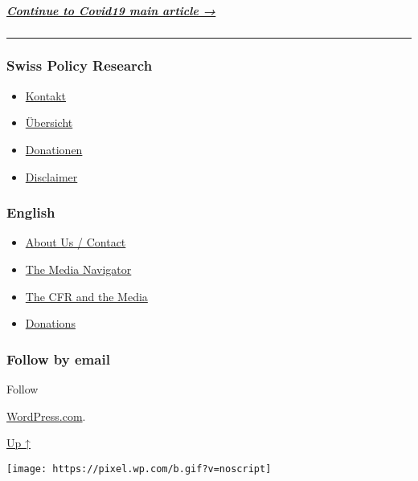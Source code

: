 \hypertarget{continue-to-covid19-main-article-}{%
\subparagraph{\texorpdfstring{\href{https://swprs.org/facts-about-covid19-greek/}{Continue
to Covid19 main article
→}}{Continue to Covid19 main article →}}\label{continue-to-covid19-main-article-}}

\begin{center}\rule{0.5\linewidth}{\linethickness}\end{center}

\hypertarget{swiss-policy-research}{%
\subsubsection{Swiss Policy Research}\label{swiss-policy-research}}

\begin{itemize}
\tightlist
\item
  \href{https://swprs.org/kontakt/}{Kontakt}
\item
  \href{https://swprs.org/uebersicht/}{Übersicht}
\item
  \href{https://swprs.org/donationen/}{Donationen}
\item
  \href{https://swprs.org/disclaimer/}{Disclaimer}
\end{itemize}

\hypertarget{english}{%
\subsubsection{English}\label{english}}

\begin{itemize}
\tightlist
\item
  \href{https://swprs.org/contact/}{About Us / Contact}
\item
  \href{https://swprs.org/media-navigator/}{The Media Navigator}
\item
  \href{https://swprs.org/the-american-empire-and-its-media/}{The CFR
  and the Media}
\item
  \href{https://swprs.org/donations/}{Donations}
\end{itemize}

\hypertarget{follow-by-email}{%
\subsubsection{Follow by email}\label{follow-by-email}}

Follow

\href{https://wordpress.com/?ref=footer_custom_com}{WordPress.com}.

\protect\hyperlink{}{Up ↑}

\texttt{[image: https://pixel.wp.com/b.gif?v=noscript]}
